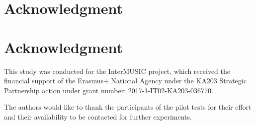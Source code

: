 
\section*{Acknowledgment}
\section{Acknowledgment}
This study was conducted for the InterMUSIC project,
which received the financial support of the Erasmus+ National Agency under the KA203 Strategic Partnership action under grant number: 2017-1-IT02-KA203-036770.

The authors would like to thank the participants of the  pilot tests for their effort and their availability to be contacted for further experiments. 